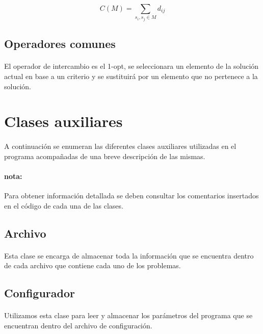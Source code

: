 \documentclass{article}
\begin{document}
	\[ C(M)=\sum_{s_i , s_j \in M} d_{ij}\]
	
	\subsection{Operadores comunes}
	
	\paragraph{}El operador de intercambio es el 1-opt, se seleccionara un elemento de la solución actual en base a un criterio y se sustituirá por un elemento que no pertenece a la solución. 
	
	\section{Clases auxiliares}
	
	\paragraph{} A continuación se enumeran las diferentes clases auxiliares utilizadas en el programa acompañadas de una breve descripción de las mismas.
	
	\paragraph{nota:}Para obtener información detallada se deben consultar los comentarios insertados en el código de cada una de las clases.
	
	\subsection{Archivo}
	
	\paragraph{}Esta clase se encarga de almacenar toda la información que se encuentra dentro de cada archivo que contiene cada uno de los problemas.
	
	
	\subsection{Configurador}
	
	\paragraph{}Utilizamos esta clase para leer y almacenar los parámetros del programa que se encuentran dentro del archivo de configuración.
	
\end{document}

